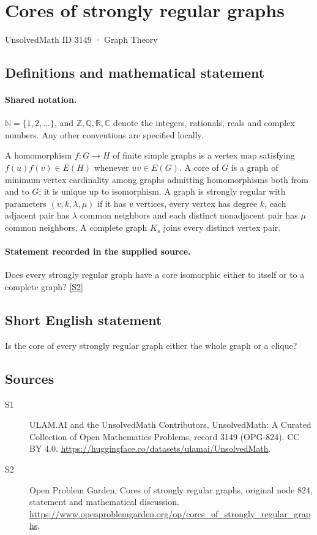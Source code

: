 \documentclass[11pt]{article}
\newcommand{\sref}[2]{\hyperlink{source:#1:#2}{[S#2]}}
\begin{document}
\setcounter{section}{3148}
\section{Cores of strongly regular graphs}\label{3149}
{\small\sffamily UnsolvedMath ID 3149 · Graph Theory}
\subsection{Definitions and mathematical statement}

\paragraph{Shared notation.}$\mathbb N=\{1,2,\ldots\}$, and $\mathbb Z,\mathbb Q,\mathbb R,\mathbb C$ denote the integers, rationals, reals and complex numbers. Any other conventions are specified locally.


A homomorphism $f:G\to H$ of finite simple graphs is a vertex map satisfying $f(u)f(v)\in E(H)$ whenever $uv\in E(G)$. A core of $G$ is a graph of minimum vertex cardinality among graphs admitting homomorphisms both from and to $G$; it is unique up to isomorphism. A graph is strongly regular with parameters $(v,k,\lambda,\mu)$ if it has $v$ vertices, every vertex has degree $k$, each adjacent pair has $\lambda$ common neighbors and each distinct nonadjacent pair has $\mu$ common neighbors. A complete graph $K_s$ joins every distinct vertex pair.
\paragraph{Statement recorded in the supplied source.}
Does every strongly regular graph have a core isomorphic either to itself or to a complete graph? \sref{3149}{2}
\subsection{Short English statement}
Is the core of every strongly regular graph either the whole graph or a clique?
\subsection{Sources}
\begin{description}
\item[\hypertarget{source:3149:1}{S1}] ULAM.AI and the UnsolvedMath Contributors, UnsolvedMath: A Curated Collection of Open Mathematics Problems, record 3149 (OPG-824). CC BY 4.0. \url{https://huggingface.co/datasets/ulamai/UnsolvedMath}.
\item[\hypertarget{source:3149:2}{S2}] Open Problem Garden, Cores of strongly regular graphs, original node 824, statement and mathematical discussion. \url{https://www.openproblemgarden.org/op/cores_of_strongly_regular_graphs}.
\end{description}
\label{end:3149}
\end{document}
